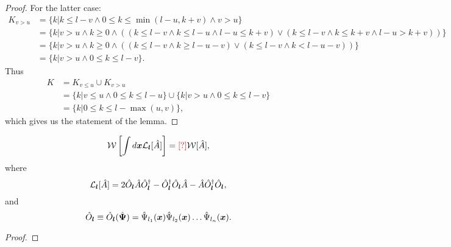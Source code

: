 \begin{proof}
For the latter case:
\begin{equation*}
\begin{split}
	K_{v > u}
	& = \{k |
		k \le l - v
		\wedge 0 \le k \le \min(l - u, k + v)
		\wedge v > u
	\} \\
	& = \{k |
		v > u \wedge k \ge 0
		\wedge
		(
			(k \le l - v \wedge k \le l - u \wedge l - u \le k + v)
			\vee
			(k \le l - v \wedge k \le k + v \wedge l - u > k + v)
		)
	\} \\
	& = \{k |
		v > u \wedge k \ge 0
		\wedge
		(
			(k \le l - v \wedge k \ge l - u - v)
			\vee
			(k \le l - v \wedge k < l - u - v)
		)
	\} \\
	& = \{k | v > u \wedge 0 \le k \le l - v \}.
\end{split}
\end{equation*}
Thus
\begin{equation*}
\begin{split}
	K
	& = K_{v \le u} \cup K_{v > u} \\
	& = \{k | v \le u \wedge 0 \le k \le l - u \} \cup \{k | v > u \wedge 0 \le k \le l - v \} \\
	& = \{k | 0 \le k \le l - \max(u, v) \},
\end{split}
\end{equation*}
which gives us the statement of the lemma.
\end{proof}

\begin{theorem}
\[
	\mathcal{W} \left[
		\int d\boldsymbol{x} \mathcal{L}_{\boldsymbol{l}} [\hat{A}]
	\right] = \textcolor{red}{[?]} \mathcal{W}[\hat{A}],
\]
where
\[
	\mathcal{L}_{\boldsymbol{l}} [\hat{A}]
	= 2 \hat{O}_{\boldsymbol{l}} \hat{A} \hat{O}_{\boldsymbol{l}}^\dagger
		- \hat{O}_{\boldsymbol{l}}^\dagger \hat{O}_{\boldsymbol{l}} \hat{A}
		- \hat{A} \hat{O}_{\boldsymbol{l}}^\dagger \hat{O}_{\boldsymbol{l}},
\]
and
\[
	\hat{O}_{\boldsymbol{l}}
	\equiv \hat{O}_{\boldsymbol{l}} (\hat{\boldsymbol{\Psi}})
	= \hat{\Psi}_{l_{1}} (\boldsymbol{x}) \hat{\Psi}_{l_{2}} (\boldsymbol{x}) \ldots \hat{\Psi}_{l_{n}} (\boldsymbol{x}).
\]
\end{theorem}
\begin{proof}
\end{proof}